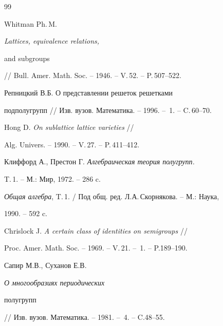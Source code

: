 \begin{thebibliography}{99}







Whitman Ph.\,M. {\em Lattices, equivalence relations,


and subgroups} // Bull. Amer. Math. Soc. -- 1946. -- V.\,52. -- P.\,507--522.







Репницкий В.Б. О представлении решеток решетками


подполугрупп // Изв. вузов. Математика. -- 1996. -- \No\,1. -- C.\,60--70.







Hong D. {\em On sublattice lattice varieties} //


Alg. Univers. -- 1990. -- V.\,27. -- P.\,411--412.







Клиффорд А., Престон Г. {\em Алгебраическая теория полугрупп.}


T.\,1. -- М.: Мир, 1972. -- 286 c.







{\em Общая алгебра}, T.\,1. / Под общ. ред. Л.А.\,Скорнякова. -- М.: Наука,


1990. -- 592 c.







Chrislock J. {\em A certain class of identities on semigroups} //


Proc. Amer. Math. Soc. -- 1969. -- V.\,21. -- \No\,1. -- P.\.189--190.







Сапир М.В., Суханов Е.В. {\em О многообразиях периодических


полугрупп} // Изв. вузов. Математика. -- 1981. -- \No\,4. -- C.48--55.








\end{thebibliography}
